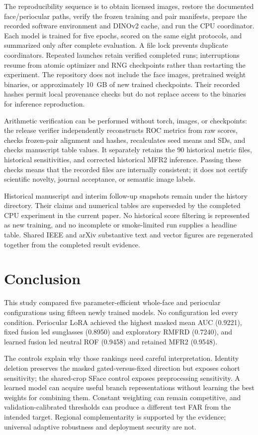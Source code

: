 \documentclass[12pt,a4paper,oneside]{report}
\begin{document}
The reproducibility sequence is to obtain licensed images, restore the documented face/periocular paths, verify the frozen training and pair manifests, prepare the recorded software environment and DINOv2 cache, and run the CPU coordinator. Each model is trained for five epochs, scored on the same eight protocols, and summarized only after complete evaluation. A file lock prevents duplicate coordinators. Repeated launches retain verified completed runs; interruptions resume from atomic optimizer and RNG checkpoints rather than restarting the experiment. The repository does not include the face images, pretrained weight binaries, or approximately 10~GB of new trained checkpoints. Their recorded hashes permit local provenance checks but do not replace access to the binaries for inference reproduction.

Arithmetic verification can be performed without torch, images, or checkpoints: the release verifier independently reconstructs ROC metrics from raw scores, checks frozen-pair alignment and hashes, recalculates seed means and SDs, and checks manuscript table values. It separately retains the 90 historical metric files, historical sensitivities, and corrected historical MFR2 inference. Passing these checks means that the recorded files are internally consistent; it does not certify scientific novelty, journal acceptance, or semantic image labels.

Historical manuscript and interim follow-up snapshots remain under the history directory. Their claims and numerical tables are superseded by the completed CPU experiment in the current paper. No historical score filtering is represented as new training, and no incomplete or smoke-limited run supplies a headline table. Shared IEEE and arXiv substantive text and vector figures are regenerated together from the completed result evidence.

\chapter{Conclusion}
This study compared five parameter-efficient whole-face and periocular configurations using fifteen newly trained models. No configuration led every condition. Periocular LoRA achieved the highest masked mean AUC (0.9221), fixed fusion led sunglasses (0.8950) and exploratory RMFRD (0.7240), and learned fusion led neutral ROF (0.9458) and retained MFR2 (0.9548).

The controls explain why those rankings need careful interpretation. Identity deletion preserves the masked gated-versus-fixed direction but exposes cohort sensitivity; the shared-crop SFace control exposes preprocessing sensitivity. A learned model can acquire useful branch representations without learning the best weights for combining them. Constant weighting can remain competitive, and validation-calibrated thresholds can produce a different test FAR from the intended target. Regional complementarity is supported by the evidence; universal adaptive robustness and deployment security are not.
\end{document}

